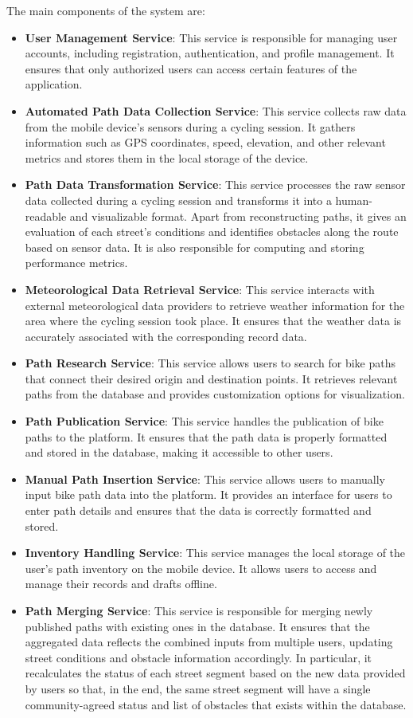 \vspace{0.5cm}
The main components of the system are:
\begin{itemize}
    \item \textbf{User Management Service}: This service is responsible for managing user accounts, including registration, authentication, and profile management. It ensures that only authorized users can access certain features of the application.
    \item \textbf{Automated Path Data Collection Service}: This service collects raw data from the mobile device's sensors during a cycling session. It gathers information such as GPS coordinates, speed, elevation, and other relevant metrics and stores them in the local storage of the device.
    \item \textbf{Path Data Transformation Service}: This service processes the raw sensor data collected during a cycling session and transforms it into a human-readable and visualizable format. Apart from reconstructing paths, it gives an evaluation of each street's conditions and identifies obstacles along the route based on sensor data. It is also responsible for computing and storing performance metrics.
    \item \textbf{Meteorological Data Retrieval Service}: This service interacts with external meteorological data providers to retrieve weather information for the area where the cycling session took place. It ensures that the weather data is accurately associated with the corresponding record data.
    \item \textbf{Path Research Service}: This service allows users to search for bike paths that connect their desired origin and destination points. It retrieves relevant paths from the database and provides customization options for visualization.
    \item \textbf{Path Publication Service}: This service handles the publication of bike paths to the platform. It ensures that the path data is properly formatted and stored in the database, making it accessible to other users.
    \item \textbf{Manual Path Insertion Service}: This service allows users to manually input bike path data into the platform. It provides an interface for users to enter path details and ensures that the data is correctly formatted and stored.
    \item \textbf{Inventory Handling Service}: This service manages the local storage of the user's path inventory on the mobile device. It allows users to access and manage their records and drafts offline.
    \item \textbf{Path Merging Service}: This service is responsible for merging newly published paths with existing ones in the database. It ensures that the aggregated data reflects the combined inputs from multiple users, updating street conditions and obstacle information accordingly. In particular, it recalculates the status of each street segment based on the new data provided by users so that, in the end, the same street segment will have a single community-agreed status and list of obstacles that exists within the database.
\end{itemize}

